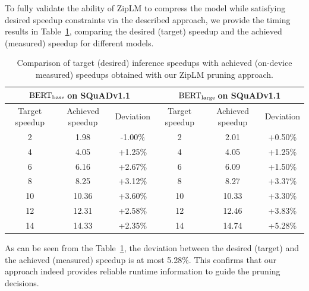 \documentclass{article}
\newcommand{\bertbase}{$\textrm{BERT}_{\small{\textrm{base}}}\,$}
\newcommand{\bertlarge}{$\textrm{BERT}_{\small{\textrm{large}}}\,$}
\theoremstyle{plain}
\theoremstyle{definition}
\theoremstyle{remark}
\begin{document}
To fully validate the ability of ZipLM to compress the model while satisfying desired speedup constraints via the described approach, we provide the timing results in Table~\ref{tab:speedups}, comparing the desired (target) speedup and the achieved (measured) speedup for different models.

\begin{table}
    \caption{Comparison of target (desired) inference speedups with achieved (on-device measured) speedups obtained with our ZipLM pruning approach.}
    \label{tab:speedups}
    \centering
    \small{
      \begin{tabular}{ccc|ccc}
        \toprule
        \multicolumn{3}{c|}{\bertbase on SQuADv1.1} & \multicolumn{3}{c}{\bertlarge on SQuADv1.1} \\
        \hline
        Target speedup & Achieved speedup & Deviation & Target speedup & Achieved speedup & Deviation \\
        \hline
        2 & 1.98 & -1.00\% & 2 & 2.01 & +0.50\% \\
        4 & 4.05 & +1.25\% & 4 & 4.05 & +1.25\% \\
        6 & 6.16 & +2.67\% & 6 & 6.09 & +1.50\% \\
        8 & 8.25 & +3.12\% & 8 & 8.27 & +3.37\% \\
        10 & 10.36 & +3.60\% & 10 & 10.33 & +3.30\%\\
        12 & 12.31 & +2.58\% & 12 & 12.46 & +3.83\% \\
        14 & 14.33 & +2.35\% & 14 & 14.74 & +5.28\% \\
        \bottomrule
      \end{tabular}
     }
\end{table}

As can be seen from the Table~\ref{tab:speedups}, the deviation between the desired (target) and the achieved (measured) speedup is at most 5.28\%. This confirms that our approach indeed provides reliable runtime information to guide the pruning decisions.
\end{document}

